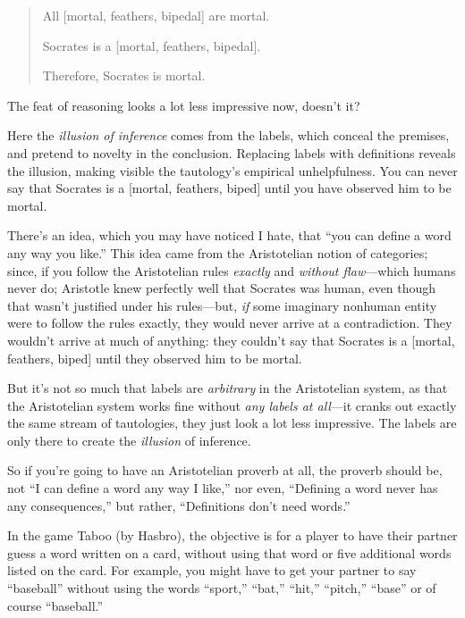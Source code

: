 {\begin{quotation}
 All [mortal, {\textlnot}feathers, bipedal] are mortal.


 Socrates is a [mortal, {\textlnot}feathers, bipedal].

{
  Therefore, Socrates is mortal.}
\end{quotation}


 The feat of reasoning looks a lot less impressive now,
doesn't it?


 Here the \textit{illusion of inference} comes from the labels,
which conceal the premises, and pretend to novelty in the conclusion.
Replacing labels with definitions reveals the illusion, making visible
the tautology's empirical unhelpfulness. You can never
say that Socrates is a [mortal, {\textlnot}feathers, biped] until you
have observed him to be mortal.


 There's an idea, which you may have noticed I
hate, that ``you can define a word any way you
like.'' This idea came from the Aristotelian notion
of categories; since, if you follow the Aristotelian rules
\textit{exactly} and \textit{without flaw}{}---which humans never do;
Aristotle knew perfectly well that Socrates was human, even though that
wasn't justified under his rules---but, \textit{if}
some imaginary nonhuman entity were to follow the rules exactly, they
would never arrive at a contradiction. They wouldn't
arrive at much of anything: they couldn't say that
Socrates is a [mortal, {\textlnot}feathers, biped] until they observed
him to be mortal.


 But it's not so much that labels are
\textit{arbitrary} in the Aristotelian system, as that the Aristotelian
system works fine without \textit{any labels at all}{}---it cranks out
exactly the same stream of tautologies, they just look a lot less
impressive. The labels are only there to create the \textit{illusion}
of inference.


 So if you're going to have an Aristotelian proverb
at all, the proverb should be, not ``I can define a
word any way I like,'' nor even,
``Defining a word never has any
consequences,'' but rather,
``Definitions don't need
words.''

\myendsectiontext



 In the game Taboo (by Hasbro), the objective is for a player to
have their partner guess a word written on a card, without using that
word or five additional words listed on the card. For example, you
might have to get your partner to say
``baseball'' without using the words
``sport,''
``bat,''
``hit,''
``pitch,''
``base'' or of course
``baseball.'' 


}
